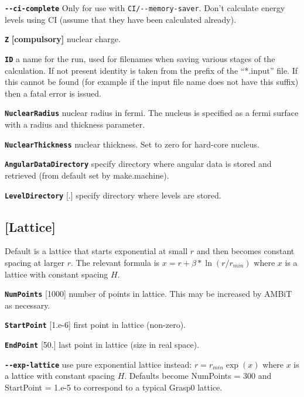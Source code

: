 \documentclass[a4paper,11pt]{article}
\newcommand{\option}[1]{\smallskip\noindent\textbf{\texttt{#1}}}
\newcommand{\code}[1]{\texttt{#1}}
\begin{document}
\option{-{}-ci-complete} Only for use with \code{CI/-{}-memory-saver}. Don't calculate energy levels using CI (assume that they have been calculated already).

\option{Z} \textbf{[compulsory]} nuclear charge.


\option{ID} a name for the run, used for filenames when saving various stages of the calculation. If not present identity is taken from the prefix of the ``*.input'' file. If this cannot be found (for example if the input file name does not have this suffix) then a fatal error is issued.


\option{NuclearRadius} nuclear radius in fermi. The nucleus is specified as a fermi surface with a radius and thickness parameter.

\option{NuclearThickness} nuclear thickness. Set to zero for hard-core nucleus.

\option{AngularDataDirectory} specify directory where angular data is stored and retrieved (from default set by make.machine).

\option{LevelDirectory} [.] specify directory where levels are stored.

\subsection{[Lattice]}
Default is a lattice that starts exponential at small $r$ and then becomes constant spacing at larger $r$. The relevant formula is $x = r + \beta*\ln(r/r_{min})$ where $x$ is a lattice with constant spacing $H$.

\option{NumPoints} [1000] number of points in lattice. This may be increased by AMBiT as necessary.

\option{StartPoint} [1.e-6] first point in lattice (non-zero).

\option{EndPoint} [50.] last point in lattice (size in real space).

\option{-{}-exp-lattice} use pure exponential lattice instead: $r = r_{min}\exp(x)$ where $x$ is a lattice with constant spacing $H$. Defaults become NumPoints = 300 and StartPoint = 1.e-5 to correspond to a typical Grasp0 lattice.
\end{document}
